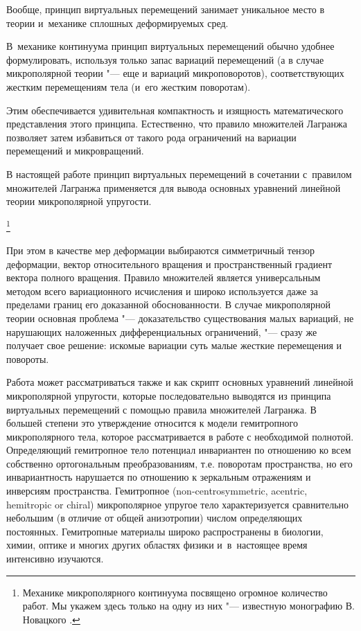 Вообще, принцип виртуальных перемещений занимает уникальное место в теории и~механике сплошных деформируемых сред. 

В~механике континуума принцип виртуальных перемещений обычно удобнее формулировать, используя только запас вариаций перемещений (а в случае микрополярной теории "--- еще и вариаций микроповоротов), соответствующих жестким перемещениям тела (и~его жестким поворотам). 

Этим обеспечивается удивительная компактность и изящность математического представления этого принципа. Естественно, что правило множителей Лагранжа позволяет затем избавиться от такого рода ограничений на вариации перемещений и микровращений.



В настоящей работе принцип виртуальных перемещений в сочетании с~правилом множителей Лагранжа применяется для вывода основных уравнений линейной теории микрополярной упругости.%

\footnote{Механике микрополярного континуума посвящено огромное количество работ. Мы укажем здесь только на одну из них "--- известную монографию В. Новацкого \cite{Nowacki-1975}.}\!\!

При этом в качестве мер деформации выбираются симметричный тензор деформации, вектор относительного вращения и пространственный градиент вектора полного вращения. Правило множителей является универсальным методом всего вариационного исчисления и широко используется даже за пределами границ его доказанной обоснованности. В случае микрополярной теории основная проблема "--- доказательство существования малых вариаций, не нарушающих наложенных дифференциальных ограничений, "--- сразу же получает свое решение: искомые вариации суть малые жесткие перемещения и повороты.



Работа может рассматриваться также и как скрипт основных уравнений линейной микрополярной упругости, которые последовательно выводятся из принципа виртуальных перемещений с помощью правила множителей Лагранжа. В большей степени это утверждение относится к модели гемитропного  микрополярного тела, которое рассматривается в работе с необходимой полнотой. Определяющий гемитропное тело потенциал инвариантен по отношению ко всем собственно ортогональным преобразованиям, т.е. поворотам пространства, но его инвариантность нарушается по отношению к зеркальным отражениям и инверсиям пространства. Гемитропное (non-centrosymmetric, acentric, hemitropic or chiral) микрополярное упругое тело характеризуется сравнительно небольшим (в отличие от общей анизотропии) числом определяющих постоянных. Гемитропные материалы широко распространены в биологии, химии, оптике и многих других областях физики и~в~настоящее время интенсивно изучаются.



